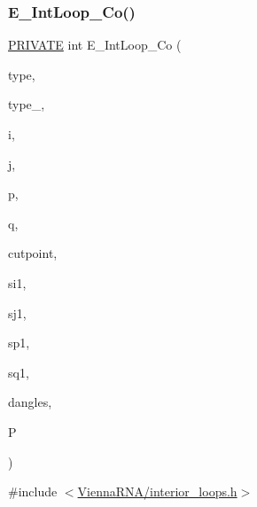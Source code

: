 \subsubsection{\texorpdfstring{E\+\_\+\+Int\+Loop\+\_\+\+Co()}{E\_IntLoop\_Co()}}
{\footnotesize\ttfamily \mbox{\hyperlink{group__utils_ga5e151c615eda34903514212f05a5ccf8}{P\+R\+I\+V\+A\+TE}} int E\+\_\+\+Int\+Loop\+\_\+\+Co (\begin{DoxyParamCaption}\item[{int}]{type,  }\item[{int}]{type\+\_,  }\item[{int}]{i,  }\item[{int}]{j,  }\item[{int}]{p,  }\item[{int}]{q,  }\item[{int}]{cutpoint,  }\item[{short}]{si1,  }\item[{short}]{sj1,  }\item[{short}]{sp1,  }\item[{short}]{sq1,  }\item[{int}]{dangles,  }\item[{\mbox{\hyperlink{group__energy__parameters_ga8a69ca7d787e4fd6079914f5343a1f35}{vrna\+\_\+param\+\_\+t}} $\ast$}]{P }\end{DoxyParamCaption})}



{\ttfamily \#include $<$\mbox{\hyperlink{interior__loops_8h}{Vienna\+R\+N\+A/interior\+\_\+loops.\+h}}$>$}

\mbox{\label{group__loops_ga7023a0172febe830dfca95499d8d1bbb}} 
